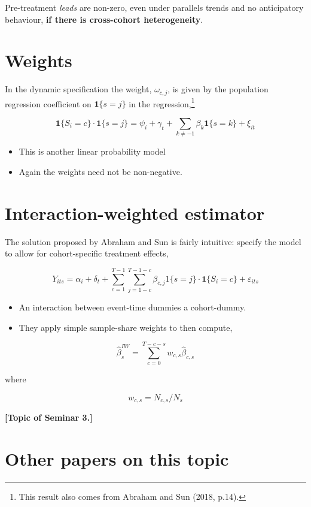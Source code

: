 \documentclass[
  letterpaper,
  DIV=11,
  numbers=noendperiod]{scrreprt}
\providecommand{\tightlist}{%
  \setlength{\itemsep}{0pt}\setlength{\parskip}{0pt}}\usepackage{longtable,booktabs,array}
\theoremstyle{definition}
\theoremstyle{remark}
\begin{document}
Pre-treatment \emph{leads} are non-zero, even under parallels trends and
no anticipatory behaviour, \textbf{if there is cross-cohort
heterogeneity}.

\section{Weights}\label{weights-1}

In the dynamic specification the weight, \(\omega_{c,j}\), is given by
the population regression coefficient on \(\mathbf{1}\{s=j\}\) in the
regression,\footnote{This result also comes from Abraham and Sun (2018,
  p.14).}

\[
\mathbf{1}\{S_i=c\}\cdot\mathbf{1}\{s=j\} = \psi_i + \gamma_t + \sum_{k\neq-1}\beta_k \mathbf{1}\{s=k\} + \xi_{it}
\]

\begin{itemize}
\tightlist
\item
  This is another linear probability model
\item
  Again the weights need not be non-negative.
\end{itemize}

\section{Interaction-weighted
estimator}\label{interaction-weighted-estimator}

The solution proposed by Abraham and Sun is fairly intuitive: specify
the model to allow for cohort-specific treatment effects,

\[
Y_{its} = \alpha_i + \delta_t + \sum_{c=1}^{T-1}\sum_{j=1-c}^{T-1-c}\beta_{c,j} 1\{s=j\}\cdot\mathbf{1}\{S_i=c\} + \varepsilon_{its}
\]

\begin{itemize}
\tightlist
\item
  An interaction between event-time dummies a cohort-dummy.
\item
  They apply simple sample-share weights to then compute,
\end{itemize}

\[
\hat{\beta}_s^{IW} = \sum_{c=0}^{T-c-s}w_{c,s} \hat{\beta}_{c,s}
\]

where

\[
w_{c,s} = N_{c,s}/N_{s}
\]

\textbf{{[}Topic of Seminar 3.{]}}

\section{Other papers on this topic}\label{other-papers-on-this-topic}
\end{document}
